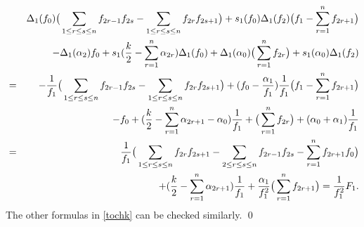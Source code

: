 \begin{eqnarray*}
&&\Delta_1(f_0)
\big(
\sum_{1\le r\le s \le n} f_{2r-1}f_{2s}-\sum_{1\le r\le s\le n} f_{2r}f_{2s+1}\big)
+s_1(f_0)\Delta_1(f_2)\big(f_1-\sum_{r=1}^n f_{2r+1}\big)
\\
&&
-\Delta_1(\alpha_{2})f_0+s_1(\frac{k}{2}-\sum_{r=1}^n \alpha_{2r})\Delta_1(f_0)
+\Delta_1(\alpha_0)\big(\sum_{r=1}^n f_{2r}\big)
+s_1(\alpha_0)\Delta_1(f_2)
\notag\\
&=&-\frac{1}{f_1}
\big(
\sum_{1\le r\le s \le n} f_{2r-1}f_{2s}-\sum_{1\le r\le s\le n} f_{2r}f_{2s+1}\big)
+(f_0-\frac{\alpha_1}{f_1})\frac{1}{f_1}\big(f_1-\sum_{r=1}^n f_{2r+1}\big)
\notag\\
&&\quad
-f_0+(\frac{k}{2}-\sum_{r=1}^n \alpha_{2r+1}-\alpha_0)\frac{1}{f_1}
+\big(\sum_{r=1}^n f_{2r}\big)
+(\alpha_0+\alpha_1)\frac{1}{f_1}
\notag\\
&=&\frac{1}{f_1}
\big(\sum_{1\le r\le s\le n} f_{2r}f_{2s+1}
-\sum_{2\le r\le s \le n} f_{2r-1}f_{2s}-\sum_{r=1}^n f_{2r+1}f_0\big)
\notag\\
&&\quad
+(\frac{k}{2}-\sum_{r=1}^n \alpha_{2r+1})\frac{1}{f_1}
+\frac{\alpha_1}{f_1^2}\big(\sum_{r=1}^n f_{2r+1}\big)
=\frac{1}{f_1^2}F_1.
\notag
\end{eqnarray*}
The other formulas in \eqref{tochk} can be checked similarly.
\quad\qed

